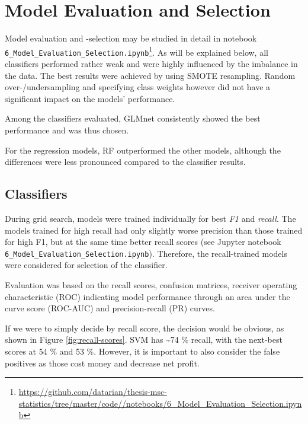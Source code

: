 \documentclass[
  11pt,
  a4paper,
  DIV=12,captions=tableheading,oneside,titlepage]{scrbook}
\begin{document}
\hypertarget{results-models}{%
\section{Model Evaluation and Selection}\label{results-models}}

Model evaluation and -selection may be studied in detail in notebook \texttt{6\_Model\_Evaluation\_Selection.ipynb}\footnote{\url{https://github.com/datarian/thesis-msc-statistics/tree/master/code//notebooks/6_Model_Evaluation_Selection.ipynb}}. As will be explained below, all classifiers performed rather weak and were highly influenced by the imbalance in the data. The best results were achieved by using SMOTE resampling. Random over-/undersampling and specifying class weights however did not have a significant impact on the models' performance.

Among the classifiers evaluated, GLMnet consistently showed the best performance and was thus chosen.

For the regression models, RF outperformed the other models, although the differences were less pronounced compared to the classifier results.

\hypertarget{classifiers-1}{%
\subsection{Classifiers}\label{classifiers-1}}

During grid search, models were trained individually for best \emph{F1} and \emph{recall}. The models trained for high recall had only slightly worse precision than those trained for high F1, but at the same time better recall scores (see Jupyter notebook \texttt{6\_Model\_Evaluation\_Selection.ipynb}). Therefore, the recall-trained models were considered for selection of the classifier.

Evaluation was based on the recall scores, confusion matrices, receiver operating characteristic (ROC) indicating model performance through an area under the curve score (ROC-AUC) and precision-recall (PR) curves.

If we were to simply decide by recall score, the decision would be obvious, as shown in Figure \ref{fig:recall-scores}. SVM has \textasciitilde{}74 \% recall, with the next-best scores at 54 \% and 53 \%. However, it is important to also consider the false positives as those cost money and decrease net profit.
\end{document}

